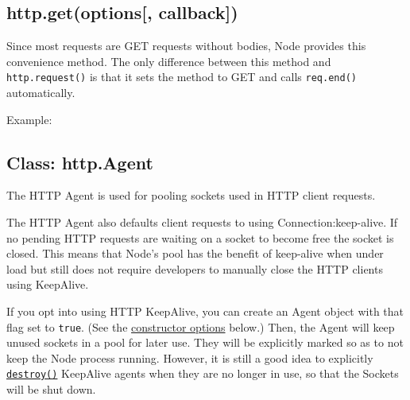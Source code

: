 \subsection{http.get(options{[},
callback{]})}\label{http.getoptions-callback}

Since most requests are GET requests without bodies, Node provides this
convenience method. The only difference between this method and
\texttt{http.request()} is that it sets the method to GET and calls
\texttt{req.end()} automatically.

Example:

\begin{Shaded}
\begin{Highlighting}[]
\NormalTok{(}\NormalTok{, }
  \NormalTok{(} \NormalTok{+ }\NormalTok{);}
  \NormalTok{();}
\NormalTok{(}\NormalTok{, }
  \NormalTok{(} \NormalTok{+ }\NormalTok{);}
\NormalTok{\});}
\end{Highlighting}
\end{Shaded}

\subsection{Class: http.Agent}\label{class-http.agent}

The HTTP Agent is used for pooling sockets used in HTTP client requests.

The HTTP Agent also defaults client requests to using
Connection:keep-alive. If no pending HTTP requests are waiting on a
socket to become free the socket is closed. This means that Node's pool
has the benefit of keep-alive when under load but still does not require
developers to manually close the HTTP clients using KeepAlive.

If you opt into using HTTP KeepAlive, you can create an Agent object
with that flag set to \texttt{true}. (See the
\hyperref[httpux5fnewux5fagentux5foptions]{constructor options} below.)
Then, the Agent will keep unused sockets in a pool for later use. They
will be explicitly marked so as to not keep the Node process running.
However, it is still a good idea to explicitly
\hyperref[httpux5fagentux5fdestroy]{\texttt{destroy()}} KeepAlive agents
when they are no longer in use, so that the Sockets will be shut down.

